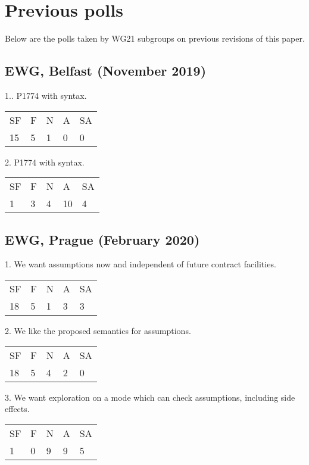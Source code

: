 \section {Previous polls}

Below are the polls taken by WG21 subgroups on previous revisions of this paper.


\subsection{EWG, Belfast (November 2019)}

1.. P1774 with  syntax.

\hspace{6mm}
\begin{tabular}{lllll}
SF & F & N & A & SA \\
15 & 5 & 1 & 0 & 0
\end{tabular}

2. P1774 with  syntax.

\hspace{6mm}
\begin{tabular}{lllll}
SF & F & N & A & SA \\
1 & 3 & 4 & 10 & 4
\end{tabular}

\subsection{EWG, Prague (February 2020)}

1. We want assumptions now and independent of future contract facilities.

\hspace{6mm}
\begin{tabular}{lllll}
SF & F & N & A & SA \\
18 & 5 & 1 & 3 & 3
\end{tabular}

2. We like the proposed semantics for assumptions.

\hspace{6mm}
\begin{tabular}{lllll}
SF & F & N & A & SA \\
18 & 5 & 4 & 2 & 0
\end{tabular}

3. We want exploration on a mode which can check assumptions, including side effects.

\hspace{6mm}
\begin{tabular}{lllll}
SF & F & N & A & SA \\
1 & 0 & 9 & 9 & 5
\end{tabular}

